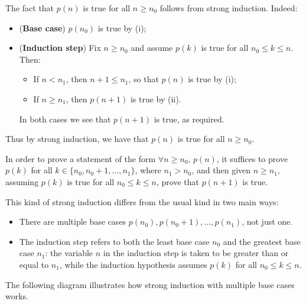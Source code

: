 \begin{cproof}
The fact that $p(n)$ is true for all $n \ge n_0$ follows from strong induction. Indeed:
\begin{itemize}
\item (\textbf{Base case}) $p(n_0)$ is true by (i);
\item (\textbf{Induction step}) Fix $n \ge n_0$ and assume $p(k)$ is true for all $n_0 \le k \le n$. Then:
\begin{itemize}
\item If $n < n_1$, then $n+1 \le n_1$, so that $p(n)$ is true by (i);
\item If $n \ge n_1$, then $p(n+1)$ is true by (ii).
\end{itemize}
In both cases we see that $p(n+1)$ is true, as required.
\end{itemize}
Thus by strong induction, we have that $p(n)$ is true for all $n \ge n_0$.
\end{cproof}

\begin{strategy}
In order to prove a statement of the form $\forall n \ge n_0,\, p(n)$, it suffices to prove $p(k)$ for all $k \in \{ n_0, n_0+1, \dots, n_1 \}$, where $n_1 > n_0$, and then given $n \ge n_1$, assuming $p(k)$ is true for all $n_0 \le k \le n$, prove that $p(n+1)$ is true.
\end{strategy}

This kind of strong induction differs from the usual kind in two main ways:
\begin{itemize}
\item There are multiple base cases $p(n_0), p(n_0+1), \dots, p(n_1)$, not just one.
\item The induction step refers to both the least base case $n_0$ and the greatest base case $n_1$: the variable $n$ in the induction step is taken to be greater than or equal to $n_1$, while the induction hypothesis assumes $p(k)$ for all $n_0 \le k \le n$.
\end{itemize}

The following diagram illustrates how strong induction with multiple base cases works.

\begin{center}
\end{center}

